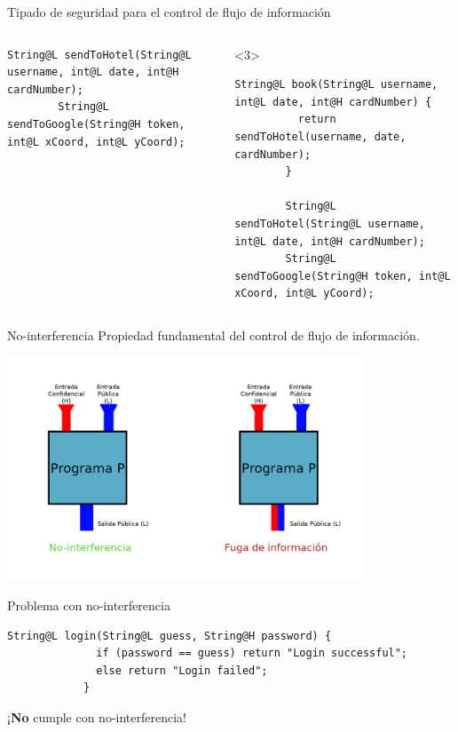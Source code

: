 \documentclass[aspectratio=169,10pt]{beamer}
\begin{document}
\begin{frame}[fragile]{Tipado de seguridad para el control de flujo de información}
\begin{columns}[T,onlytextwidth]
\begin{onlyenv}
\begin{lstlisting}[escapechar=?]
        String@L sendToHotel(String@L username, int@L date, int@H cardNumber);
        String@L sendToGoogle(String@H token, int@L xCoord, int@L yCoord);
      \end{lstlisting}
    \end{onlyenv}
		\begin{onlyenv}<3>
      \begin{lstlisting}[escapechar=?]
        String@L book(String@L username, int@L date, int@H cardNumber) {
          return sendToHotel(username, date, cardNumber);
        }

        String@L sendToHotel(String@L username, int@L date, int@H cardNumber);
        String@L sendToGoogle(String@H token, int@L xCoord, int@L yCoord);
      \end{lstlisting}
    \end{onlyenv}
  \end{columns}

\end{frame}

\begin{frame}[fragile]{No-interferencia}
  Propiedad fundamental del control de flujo de información.
	\begin{center}
		\includegraphics[width=0.8\textwidth]{images/noninterference.png}
	\end{center}
\end{frame}

\begin{frame}[fragile]{Problema con no-interferencia}
	\begin{center}
\begin{lstlisting}[basicstyle=\fontsize{9}{9}\ttfamily]
            String@L login(String@L guess, String@H password) {
              if (password == guess) return "Login successful";
              else return "Login failed";
            }
\end{lstlisting}
		\vspace{3cm}
		\alert{¡\textbf{No} cumple con no-interferencia!}
	\end{center}
\end{frame}
\end{document}
